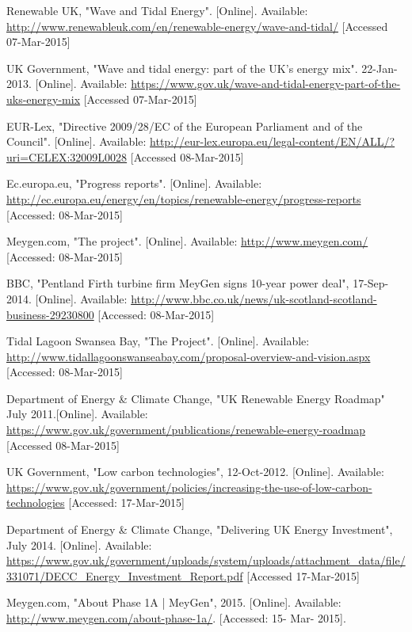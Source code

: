 \documentclass[a4paper,11pt]{article}
\begin{document}
\begin{thebibliography}{99}
	Renewable UK, "Wave and Tidal Energy". [Online]. Available: \url{http://www.renewableuk.com/en/renewable-energy/wave-and-tidal/} [Accessed 07-Mar-2015]

	UK Government, "Wave and tidal energy: part of the UK's energy mix". 22-Jan-2013. [Online]. Available: \url{https://www.gov.uk/wave-and-tidal-energy-part-of-the-uks-energy-mix} [Accessed 07-Mar-2015]
		
	EUR-Lex, "Directive 2009/28/EC of the European Parliament and of the Council". [Online]. Available: \url{http://eur-lex.europa.eu/legal-content/EN/ALL/?uri=CELEX:32009L0028} [Accessed 08-Mar-2015]
	
	Ec.europa.eu, "Progress reports". [Online]. Available: \url{http://ec.europa.eu/energy/en/topics/renewable-energy/progress-reports} [Accessed: 08-Mar-2015]
	
	Meygen.com, "The project". [Online]. Available: \url{http://www.meygen.com/} [Accessed: 08-Mar-2015]
	
	BBC, "Pentland Firth turbine firm MeyGen signs 10-year power deal", 17-Sep-2014. [Online]. Available: \url{http://www.bbc.co.uk/news/uk-scotland-scotland-business-29230800} [Accessed: 08-Mar-2015]
	
	Tidal Lagoon Swansea Bay, "The Project". [Online]. Available: \url{http://www.tidallagoonswanseabay.com/proposal-overview-and-vision.aspx} [Accessed: 08-Mar-2015]
	
	Department of Energy \& Climate Change, "UK Renewable Energy Roadmap" July 2011.[Online]. Available: \url{https://www.gov.uk/government/publications/renewable-energy-roadmap} [Accessed 08-Mar-2015]
	
	UK Government, "Low carbon technologies", 12-Oct-2012. [Online]. Available: \url{https://www.gov.uk/government/policies/increasing-the-use-of-low-carbon-technologies} [Accessed: 17-Mar-2015]
	
	Department of Energy \& Climate Change, "Delivering UK Energy Investment", July 2014. [Online]. Available: \url{https://www.gov.uk/government/uploads/system/uploads/attachment_data/file/331071/DECC_Energy_Investment_Report.pdf} [Accessed 17-Mar-2015]
	
	Meygen.com, "About Phase 1A | MeyGen", 2015. [Online]. Available: \url{http://www.meygen.com/about-phase-1a/}. [Accessed: 15- Mar- 2015].
	

\end{thebibliography}
\end{document}
